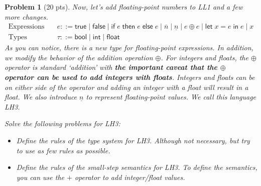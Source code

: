 \documentclass{article}
\newcommand{\m}[1]{\mathsf{#1}}
\newcommand{\num}[1]{\overline{#1}}
\newcommand{\numf}[1]{\underline{#1}}
\newcommand{\eif}[3]{\m{if} \; #1 \; \m{then} \; #2 \; \m{else} \; #3}
\newcommand{\tint}{\m{int}}
\newcommand{\tbool}{\m{bool}}
\newcommand{\elet}[3]{\m{let} \; #1 = #2 \; \m{in} \; #3}
\newcommand{\G}{\Gamma}
\newcommand{\tfloat}{\m{float}}
\newtheorem{problem}{Problem}
\newtheorem{lemma}{Lemma}
\begin{document}
\begin{problem}[20 pts]
    Now, let's add floating-point numbers to LL1 and a few more changes.
    \begin{align*}
        \text{Expressions} \quad & e ::= \m{true} \mid \m{false} \mid \eif{e}{e}{e} \mid \num{n} \mid \boxed{\numf{n}} \mid \boxed{e \oplus e} \mid \elet{x}{e}{e} \mid x \\
        \text{Types} \quad & \tau ::= \tbool \mid \tint \mid \boxed{\tfloat}
    \end{align*}
    As you can notice, there is a new type for floating-point expressions.
    In addition, we modify the behavior of the addition operation $\oplus$.
    For integers and floats, the $\oplus$ operator is standard `addition' with \textbf{the
    important caveat that the $\oplus$ operator can be used to add integers with floats}.
    Integers and floats can be on either side of the operator and adding an integer with a float
    will result in a float.
    We also introduce $\numf{n}$ to represent floating-point values.
    We call this language LH3.




Solve the following problems for LH3:

    \begin{itemize}
        \item[(10 pts)] Define the rules of the type system for LH3. Although not necessary, but try to use as
        few rules as possible.
        
        \item[(10 pts)] Define the rules of the small-step semantics for LH3. To define the semantics, you can use the $+$
        operator to add integer/float values.
    \end{itemize}
\end{problem}
\end{document}
